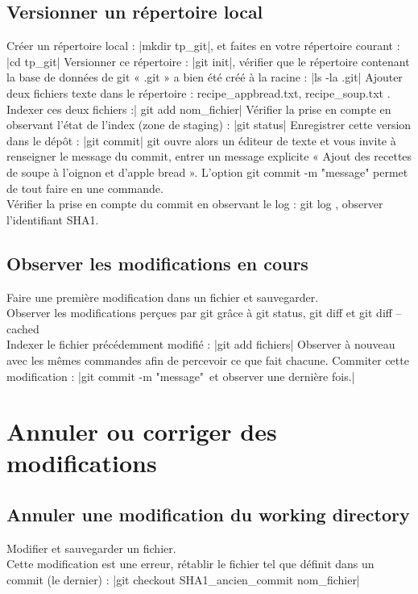\subsection{Versionner un répertoire local}
Créer un répertoire local : |mkdir tp_git|, et faites en votre répertoire courant : |cd tp_git|
Versionner ce répertoire : |git init|, vérifier que le répertoire contenant la base de données de git
« .git » a bien été créé à la racine : |ls -la .git|
Ajouter deux fichiers texte dans le répertoire : recipe\_appbread.txt, recipe\_soup.txt .\\
Indexer ces deux fichiers :| git add nom_fichier|
Vérifier la prise en compte en observant l'état de l'index (zone de staging) : |git status|
Enregistrer cette version dans le dépôt : |git commit|
git ouvre alors un éditeur de texte et vous invite à renseigner le message du commit, entrer un
message explicite « Ajout des recettes de soupe à l'oignon et d'apple bread ». L'option git
commit -m "message" permet de tout faire en une commande.\\
Vérifier la prise en compte du commit en observant le log : git log , observer l'identifiant SHA1.\\
\subsection{Observer les modifications en cours}
Faire une première modification dans un fichier et sauvegarder.\\
Observer les modifications perçues par git grâce à git status, git diff et git diff --cached\\
Indexer le fichier précédemment modifié : 
|git add fichiers|
Observer à nouveau avec les mêmes commandes afin de percevoir ce que fait chacune.
Commiter cette modification : 
|git commit -m "message"\ et observer une dernière fois.|
\section{Annuler ou corriger des modifications}
\subsection{ Annuler une modification du working directory}
Modifier et sauvegarder un fichier.\\
 Cette modification est une erreur, rétablir le fichier tel que définit dans un commit (le dernier) :
|git checkout SHA1\_ancien\_commit nom\_fichier|
